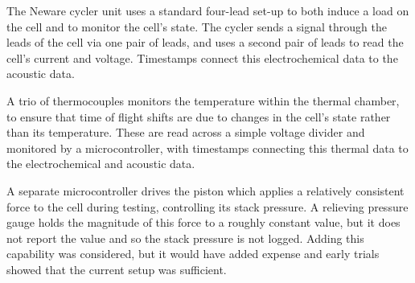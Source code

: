 The Neware cycler unit uses a standard four-lead set-up to both induce a load on the cell and to monitor the cell's state. The cycler sends a signal through the leads of the cell via one pair of leads, and uses a second pair of leads to read the cell's current and voltage. Timestamps connect this electrochemical data to the acoustic data.

A trio of thermocouples monitors the temperature within the thermal chamber, to ensure that time of flight shifts are due to changes in the cell's state rather than its temperature. These are read across a simple voltage divider and monitored by a microcontroller, with timestamps connecting this thermal data to the electrochemical and acoustic data.

A separate microcontroller drives the piston which applies a relatively consistent force to the cell during testing, controlling its stack pressure. A relieving pressure gauge holds the magnitude of this force to a roughly constant value, but it does not report the value and so the stack pressure is not logged. Adding this capability was considered, but it would have added expense and early trials showed that the current setup was sufficient.